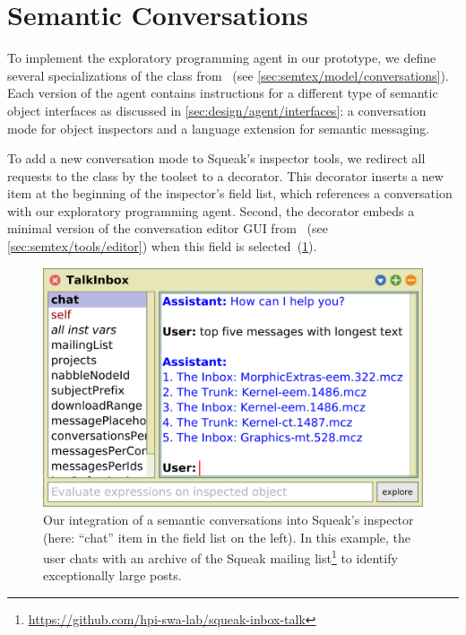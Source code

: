
\section{Semantic Conversations}
\label{sec:implementation/conversations}

To implement the exploratory programming agent in our prototype, we define several specializations of the  class from \semtex~(see \cref{sec:semtex/model/conversations}).
Each version of the agent contains instructions for a different type of semantic object interfaces as discussed in \cref{sec:design/agent/interfaces}: a conversation mode for object inspectors and a language extension for semantic messaging.

To add a new conversation mode to Squeak's inspector tools, we redirect all requests to the  class by the toolset to a decorator.
This decorator inserts a new  item at the beginning of the inspector's field list, which references a conversation with our exploratory programming agent.
Second, the decorator embeds a minimal version of the conversation editor GUI from \semtex~(see \cref{sec:semtex/tools/editor}) when this field is selected~(\cref{fig:implementation/conversations/inspector}).

\begin{figure}
	\begin{minipage}{\textwidth}
		\centering
		\includegraphics[width=.7\textwidth]{03_conversations/inspector.png}
		\caption[Our integration of semantic conversations into Squeak's inspector.]{
			Our integration of a semantic conversations into Squeak's inspector (here: ``chat'' item in the field list on the left).
			In this example, the user chats with an archive of the Squeak mailing list\footnote{\url{https://github.com/hpi-swa-lab/squeak-inbox-talk}} to identify exceptionally large posts.
		}
		\label{fig:implementation/conversations/inspector}
	\end{minipage}
\end{figure}

